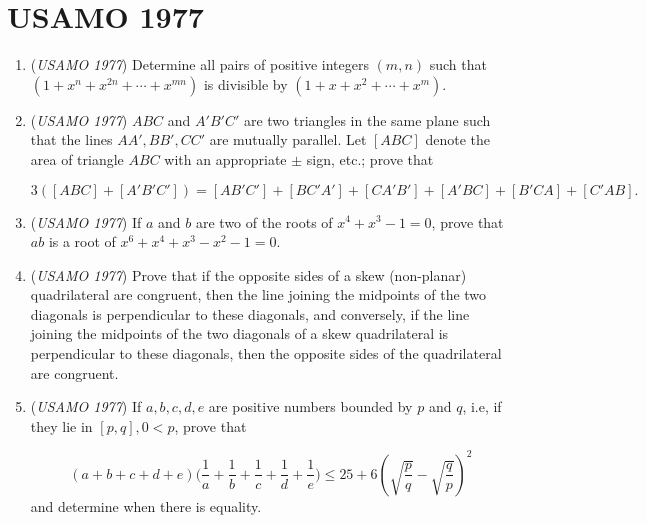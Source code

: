 \section{USAMO 1977}
        \begin{enumerate}
        	\item (\textit{USAMO 1977}) Determine all pairs of positive integers $(m,n)$ such that
$(1+x^n+x^{2n}+\cdots+x^{mn})$ is divisible by $(1+x+x^2+\cdots+x^{m})$.


 

	\item (\textit{USAMO 1977}) $ABC$ and $A'B'C'$ are two triangles in the same plane such that the lines $AA',BB',CC'$ are mutually parallel. Let $[ABC]$ denote the area of triangle $ABC$ with an appropriate $\pm$ sign, etc.; prove that

 \[3([ABC] + [A'B'C']) = [AB'C'] + [BC'A'] + [CA'B'] + [A'BC] + [B'CA] + [C'AB].\]


	\item (\textit{USAMO 1977}) If $a$ and $b$ are two of the roots of $x^4+x^3-1=0$, prove that $ab$ is a root of $x^6+x^4+x^3-x^2-1=0$.


 

	\item (\textit{USAMO 1977}) Prove that if the opposite sides of a skew (non-planar) quadrilateral are congruent, then the line joining the midpoints of the two diagonals is perpendicular to these diagonals, and conversely, if the line joining the midpoints of the two diagonals of a skew quadrilateral is perpendicular to these diagonals, then the opposite sides of the quadrilateral are congruent.


 

	\item (\textit{USAMO 1977}) If $a,b,c,d,e$ are positive numbers bounded by $p$ and $q$, i.e, if they lie in $[p,q], 0 < p$, prove that

 \[(a + b + c + d + e)\biggl(\frac {1}{a} + \frac {1}{b} + \frac {1}{c} + \frac {1}{d} + \frac {1}{e}\biggr) \le 25 + 6\left(\sqrt {\frac {p}{q}} - \sqrt {\frac {q}{p}}\right)^2\]
and determine when there is equality.


 

\end{enumerate}